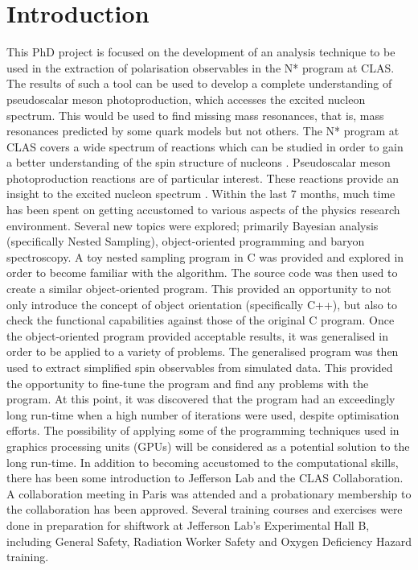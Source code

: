 \documentclass[a4paper,12pt]{article}
\begin{document}
\section{Introduction}
This PhD project is focused on the development of an analysis technique to be used in the extraction of polarisation observables in the N* program at CLAS. The results of such a tool can be used to develop a complete understanding of pseudoscalar meson photoproduction, which accesses the excited nucleon spectrum.  This would be used to find missing mass resonances, that is, mass resonances predicted by some quark models but not others.  The N* program at CLAS covers a wide spectrum of reactions which can be studied in order to gain a better understanding of the spin structure of nucleons \cite{nstar}.  Pseudoscalar meson photoproduction reactions are of particular interest.  These reactions provide an insight to the excited nucleon spectrum \cite{klempt}.   
\newline
Within the last 7 months, much time has been spent on getting accustomed to various aspects of the physics research environment.  Several new topics were explored; primarily Bayesian analysis (specifically Nested Sampling), object-oriented programming and baryon spectroscopy.  
\newline
A toy nested sampling program in C was provided \cite{sivia} and explored in order to become familiar with the algorithm.  The source code was then used to create a similar object-oriented program.  This provided an opportunity to not only introduce the concept of object orientation (specifically C++), but also to check the functional capabilities against those of the original C program.  Once the object-oriented program provided acceptable results, it was generalised in order to be applied to a variety of problems.  
\newline
The generalised program was then used to extract simplified spin observables from simulated data. This provided the opportunity to fine-tune the program and find any problems with the program. At this point, it was discovered that the program had an exceedingly long run-time when a high number of iterations were used, despite optimisation efforts.  The possibility of applying some of the programming techniques used in graphics processing units (GPUs) will be considered as a potential solution to the long run-time.
\newline
In addition to becoming accustomed to the computational skills, there has been some introduction to Jefferson Lab and the CLAS Collaboration.  A collaboration meeting in Paris was attended and a probationary membership to the collaboration has been approved.  Several training courses and exercises were done in preparation for shiftwork at Jefferson Lab's Experimental Hall B, including General Safety, Radiation Worker Safety and Oxygen Deficiency Hazard training.  
\end{document}

